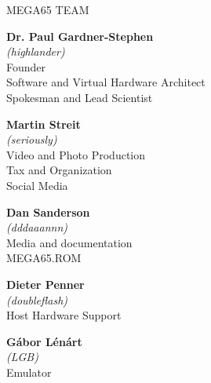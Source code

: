 \newpage
{\huge MEGA65 TEAM}\vspace{1cm}

\newenvironment{mega65thanks}{
    \setlength{\linewidth}{125mm}
    \setlength{\columnsep}{3mm}
    \begin{multicols}{2}
}{
    \end{multicols}
}

\begin{mega65thanks}

\begin{minipage}{\linewidth}
    {\large\bf Dr. Paul Gardner-Stephen} \\
    \textit{(highlander)} \\
    Founder \\
    Software and Virtual Hardware Architect \\
    Spokesman and Lead Scientist
\end{minipage}

\begin{minipage}{\linewidth}
    {\large\bf Martin Streit} \\
    \textit{(seriously)} \\
    Video and Photo Production \\
    Tax and Organization \\
    Social Media
\end{minipage}

\begin{minipage}{\linewidth}
    {\large\bf Dan Sanderson} \\
    \textit{(dddaaannn)} \\
    Media and documentation \\
    MEGA65.ROM
\end{minipage}

\begin{minipage}{\linewidth}
    {\large\bf Dieter Penner} \\
    \textit{(doubleflash)} \\
    Host Hardware Support
\end{minipage}

\begin{minipage}{\linewidth}
    {\large\bf Gábor Lénárt} \\
    \textit{(LGB)} \\
    Emulator
\end{minipage}


\end{mega65thanks}
